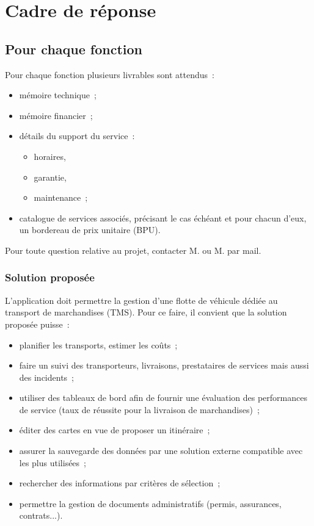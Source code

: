 \chapter{Cadre de réponse}

\section{Pour chaque fonction}
Pour chaque fonction plusieurs livrables sont attendus~:
\begin{itemize}
	\item mémoire technique~;
	\item mémoire financier~;
	\item détails du support du service~:
	\begin{itemize}
		\item horaires,
		\item garantie,
		\item maintenance~;
	\end{itemize}
	\item catalogue de services associés, précisant le cas échéant et pour chacun d'eux, un bordereau de prix unitaire (BPU).
\end{itemize}
Pour toute question relative au projet, contacter M. \mj ou M. \roland par mail.

\subsection{Solution proposée}
L'application doit permettre la gestion d'une flotte de véhicule dédiée au transport de marchandises (TMS). Pour ce faire, il convient que la solution proposée puisse~:
\begin{itemize}
	\item planifier les transports, estimer les coûts~;
	\item faire un suivi des transporteurs, livraisons, prestataires de services mais aussi des incidents~;
	\item utiliser des tableaux de bord afin de fournir une évaluation des performances de service (taux  de réussite pour la livraison de marchandises)~;
	\item éditer des cartes en vue de proposer un itinéraire~;
	\item assurer la sauvegarde des données par une solution externe compatible avec les plus utilisées~;
	\item rechercher des informations par critères de sélection~;
	\item permettre la gestion de documents administratifs (permis, assurances, contrats...).
\end{itemize}


